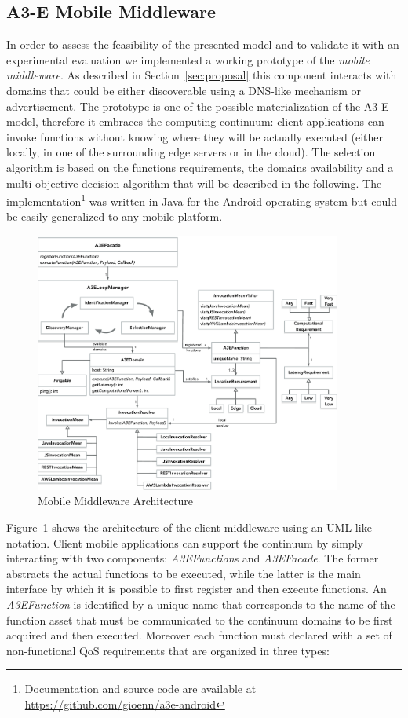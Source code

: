 \subsection{A3-E Mobile Middleware}

In order to assess the feasibility of the presented model and to validate it with an experimental evaluation we implemented a working prototype of the \textit{mobile middleware}. As described in Section~\ref{sec:proposal} this component interacts with  domains that could be either discoverable using a DNS-like mechanism or advertisement. The prototype is one of the possible materialization of the A3-E model, therefore it embraces the computing continuum: client applications can invoke functions without knowing where they will be actually executed (either locally, in one of the surrounding edge servers or in the cloud). The selection algorithm is based on the functions requirements, the domains availability and a multi-objective decision algorithm that will be described in the following. The implementation\footnote{Documentation and source code are available at \url{https://github.com/gioenn/a3e-android}} was written in Java for the Android operating system but could be easily generalized to any mobile platform. 
\begin{figure}[tbp]
	\includegraphics[width=0.9\textwidth]{figs/a3e-mobile-prototype}
	\caption{Mobile Middleware Architecture}
	\label{fig:mobile-prototype}
\end{figure}
Figure~\ref{fig:mobile-prototype} shows the architecture of the client middleware using an UML-like notation. Client mobile applications can support the continuum by simply interacting with two components:  \textit{A3EFunction}s and \textit{A3EFacade}. The former abstracts the actual functions to be executed, while the latter is the main interface by which it is possible to first register and then execute functions. An \textit{A3EFunction} is identified by a unique name that corresponds to the name of the function asset that must be communicated to the continuum domains to be first acquired and then executed. Moreover each function must declared with a set of non-functional QoS requirements that are organized in three types: 

